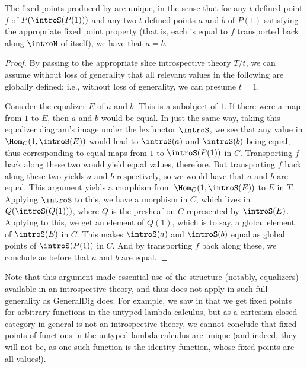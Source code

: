 \begin{theorem}\label{UniqueFixedPoints}
The fixed points produced by  are unique, in the sense that for any $t$-defined point $f$ of $P(\introS(P(1)))$ and any two $t$-defined points $a$ and $b$ of $P(1)$ satisfying the appropriate fixed point property (that is, each is equal to $f$ transported back along $\introN$ of itself), we have that $a = b$.
\end{theorem}
\begin{proof}
By passing to the appropriate slice introspective theory $T/t$, we can assume without loss of generality that all relevant values in the following are globally defined; i.e., without loss of generality, we can presume $t = 1$.

Consider the equalizer $E$ of $a$ and $b$. This is a subobject of $1$. If there were a map from $1$ to $E$, then $a$ and $b$ would be equal. In just the same way, taking this equalizer diagram's image under the lexfunctor $\introS$, we see that any value in $\Hom_C(1, \introS(E))$ would lead to $\introS(a)$ and $\introS(b)$ being equal, thus corresponding to equal maps from $1$ to $\introS(P(1))$ in $C$. Transporting $f$ back along these two would yield equal values, therefore. But transporting $f$ back along these two yields $a$ and $b$ respectively, so we would have that $a$ and $b$ are equal. This argument yields a morphism from $\Hom_C(1, \introS(E))$ to $E$ in $T$. Applying $\introS$ to this, we have a morphism in $C$, which lives in $Q(\introS(Q(1)))$, where $Q$ is the presheaf on $C$ represented by $\introS(E)$. Applying  to this, we get an element of $Q(1)$, which is to say, a global element of $\introS(E)$ in $C$. This makes $\introS(a)$ and $\introS(b)$ equal as global points of $\introS(P(1))$ in $C$. And by transporting $f$ back along these, we conclude as before that $a$ and $b$ are equal. 
\end{proof}

\begin{observation}
Note that this argument made essential use of the structure (notably, equalizers) available in an introspective theory, and thus does not apply in such full generality as GeneralDig \TODO does. For example, we saw in  that we get fixed points for arbitrary functions in the untyped lambda calculus, but as a cartesian closed category in general is not an introspective theory, we cannot conclude that fixed points of functions in the untyped lambda calculus are unique (and indeed, they will not be, as one such function is the identity function, whose fixed points are all values!).
\end{observation}


